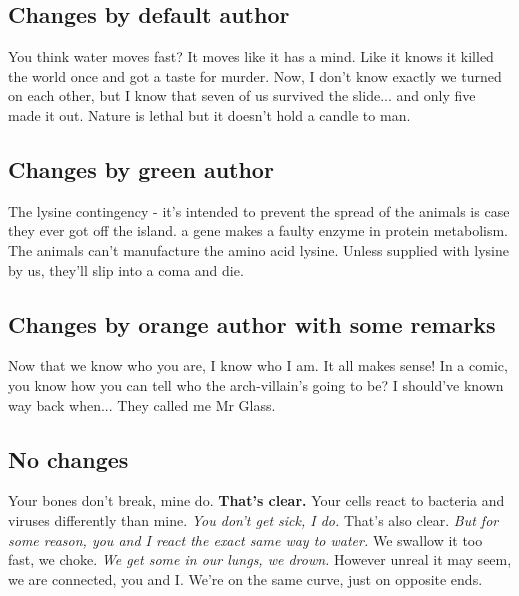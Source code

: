 \documentclass[11pt, a4paper, notitlepage, english]{article}
\begin{document}
\subsection*{Changes by default author}

You think water moves fast?
It moves like it has a mind.
Like it knows it killed the world once and got a taste for murder.
Now, I don't know exactly  we turned on each other, but I know that seven of us survived the slide... and only five made it out.
Nature is lethal but it doesn't hold a candle to man.

\subsection*{Changes by green author}

The lysine contingency - it's intended to prevent the spread of the animals is case they ever got off the island.
 a gene  makes a  faulty enzyme in protein metabolism.
The animals can't manufacture the amino acid lysine.
Unless  supplied with lysine by us, they'll slip into a coma and die.

\subsection*{Changes by orange author with some remarks}

Now that we know who you are, I know who I am.
It all makes sense!
In a comic, you know how you can tell who the arch-villain's going to be?
I should've known way back when...
They called me Mr Glass.

\subsection*{No changes}

Your bones don't break, mine do.
\textbf{That's clear.}
Your cells react to bacteria and viruses differently than mine.
\textsl{You don't get sick, I do.}
That's also clear.
\textit{But for some reason, you and I react the exact same way to water.}
We swallow it too fast, we choke.
\emph{We get some in our lungs, we drown.}
However unreal it may seem, we are connected, you and I.
We're on the same curve, just on opposite ends.
\end{document}
